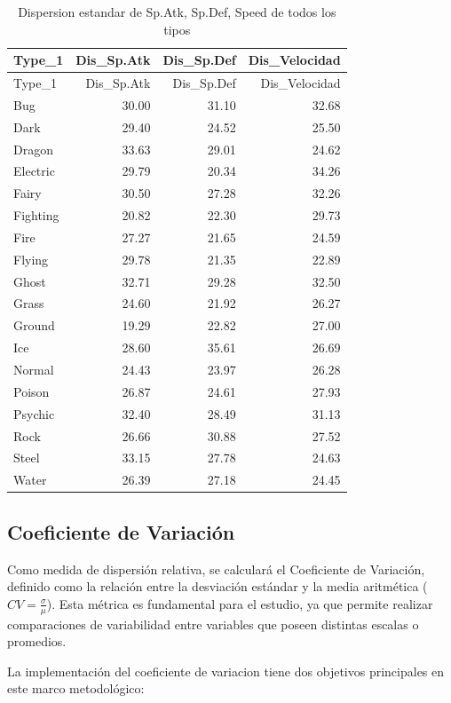 \documentclass[oneside,11pt]{Latex/Classes/PhDthesisPSnPDF}
\begin{document}
\begin{longtable}[]{@{}lrrr@{}}
\caption{Dispersion estandar de Sp.Atk, Sp.Def, Speed de todos los
tipos}\tabularnewline
\toprule\noalign{}
Type\_1 & Dis\_Sp.Atk & Dis\_Sp.Def & Dis\_Velocidad \\
\midrule\noalign{}
\endfirsthead
\toprule\noalign{}
Type\_1 & Dis\_Sp.Atk & Dis\_Sp.Def & Dis\_Velocidad \\
\midrule\noalign{}
\endhead
\bottomrule\noalign{}
\endlastfoot
Bug & 30.00 & 31.10 & 32.68 \\
Dark & 29.40 & 24.52 & 25.50 \\
Dragon & 33.63 & 29.01 & 24.62 \\
Electric & 29.79 & 20.34 & 34.26 \\
Fairy & 30.50 & 27.28 & 32.26 \\
Fighting & 20.82 & 22.30 & 29.73 \\
Fire & 27.27 & 21.65 & 24.59 \\
Flying & 29.78 & 21.35 & 22.89 \\
Ghost & 32.71 & 29.28 & 32.50 \\
Grass & 24.60 & 21.92 & 26.27 \\
Ground & 19.29 & 22.82 & 27.00 \\
Ice & 28.60 & 35.61 & 26.69 \\
Normal & 24.43 & 23.97 & 26.28 \\
Poison & 26.87 & 24.61 & 27.93 \\
Psychic & 32.40 & 28.49 & 31.13 \\
Rock & 26.66 & 30.88 & 27.52 \\
Steel & 33.15 & 27.78 & 24.63 \\
Water & 26.39 & 27.18 & 24.45 \\
\end{longtable}

\hfill\break

\subsection{Coeficiente de Variación}

Como medida de dispersión relativa, se calculará el Coeficiente de
Variación, definido como la relación entre la desviación estándar y la
media aritmética (\(CV = \frac{\sigma}{\mu}\)). Esta métrica es
fundamental para el estudio, ya que permite realizar comparaciones de
variabilidad entre variables que poseen distintas escalas o promedios.

La implementación del coeficiente de variacion tiene dos objetivos
principales en este marco metodológico:
\end{document}
